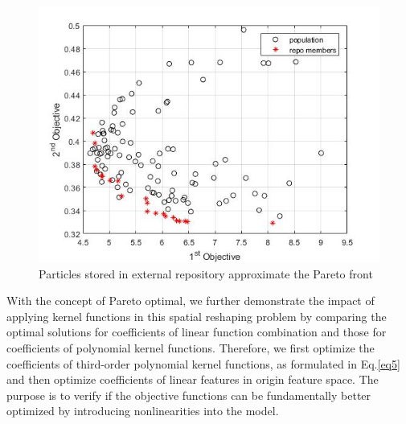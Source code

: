 \begin{figure}[t]
\centering
\includegraphics[scale=.6]{Fig/repo_members.jpg}
\caption{Particles stored in external repository approximate the Pareto front}
\label{fig:repo_members}
\end{figure}

With the concept of Pareto optimal, we further demonstrate the impact of applying kernel functions in this spatial reshaping problem by comparing the optimal solutions for coefficients of linear function combination and those for coefficients of polynomial kernel functions. Therefore, we first optimize the coefficients of third-order polynomial kernel functions, as formulated in Eq.\ref{eq5} and then optimize coefficients of linear features in origin feature space. The purpose is to verify if the objective functions can be fundamentally better optimized by introducing nonlinearities into the model. %


